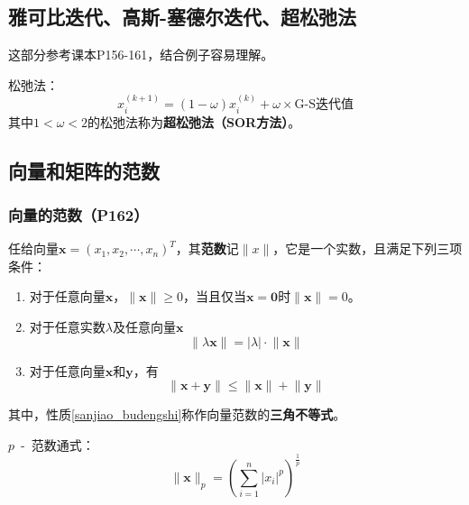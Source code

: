 \documentclass[fontset=ubuntu]{ctexart}
\numberwithin{equation}{section}
\numberwithin{theorem}{section}
\begin{document}
\begin{multicols}{2}
    \subsection{雅可比迭代、高斯-塞德尔迭代、超松弛法}

    这部分参考课本P156-161，结合例子容易理解。

    松弛法：
    \begin{equation}
        x_i^{(k+1)}=(1-\omega)x_i^{(k)}+\omega\times \text{G-S迭代值}
    \end{equation}
    其中$1<\omega<2$的松弛法称为\textbf{超松弛法（SOR方法）}。

    \subsection{向量和矩阵的范数}

    \subsubsection{向量的范数（P162）}

    任给向量$\mathbf{x}=(x_1,x_2,\cdots,x_n)^T$，其\textbf{范数}记$\lVert x\rVert$，它是一个实数，且满足下列三项条件：

    \begin{enumerate}[label=(\arabic*)]
        \item 对于任意向量$\mathbf{x}$，$\lVert \mathbf{x}\rVert\geq 0$，当且仅当$\mathbf{x}=\mathbf{0}$时$\lVert \mathbf{x}\rVert =0$。
        \item 对于任意实数$\lambda$及任意向量$\mathbf{x}$
            \begin{equation*}
                \lVert\lambda \mathbf{x}\rVert=\lvert\lambda\rvert\cdot \lVert \mathbf{x}\rVert
            \end{equation*}
        \item\label{sanjiao_budengshi} 对于任意向量$\mathbf{x}$和$\mathbf{y}$，有
            \begin{equation*}
                \lVert \mathbf{x}+\mathbf{y}\rVert\leq \lVert \mathbf{x}\rVert+\lVert \mathbf{y}\rVert
            \end{equation*}
    \end{enumerate}
    其中，性质\ref{sanjiao_budengshi}称作向量范数的\textbf{三角不等式}。

    $p$\ -\ 范数通式：
    \begin{equation}
        \lVert\mathbf{x}\rVert_p=\left(\sum_{i=1}^{n}\lvert x_i\rvert^p\right)^{\frac{1}{p}}
    \end{equation}


\end{multicols}
\end{document}
